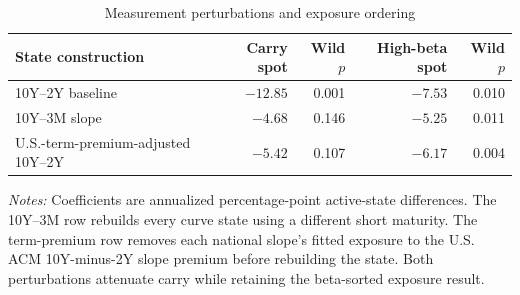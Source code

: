 \begin{table}[H]
\centering
\caption{Measurement perturbations and exposure ordering}
\label{tab:measurement-perturbations}
\small
\begin{tabular}{lrrrr}
\toprule
State construction & Carry spot & Wild $p$ & High-beta spot & Wild $p$ \\
\midrule
10Y--2Y baseline & $-12.85$ & 0.001 & $-7.53$ & 0.010 \\
10Y--3M slope & $-4.68$ & 0.146 & $-5.25$ & 0.011 \\
U.S.-term-premium-adjusted 10Y--2Y & $-5.42$ & 0.107 & $-6.17$ & 0.004 \\
\bottomrule
\end{tabular}

\begin{minipage}{0.94\textwidth}
\footnotesize\emph{Notes:} Coefficients are annualized percentage-point active-state differences. The 10Y--3M row rebuilds every curve state using a different short maturity. The term-premium row removes each national slope's fitted exposure to the U.S. ACM 10Y-minus-2Y slope premium before rebuilding the state. Both perturbations attenuate carry while retaining the beta-sorted exposure result.
\end{minipage}
\end{table}
